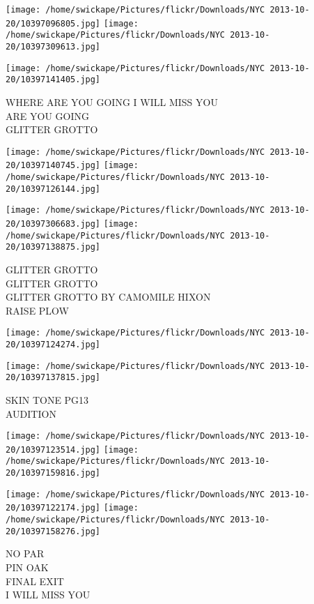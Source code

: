 \documentclass[10pt,letterpaper]{article}
\begin{document}
\texttt{[image: /home/swickape/Pictures/flickr/Downloads/NYC 2013-10-20/10397096805.jpg]}
\texttt{[image: /home/swickape/Pictures/flickr/Downloads/NYC 2013-10-20/10397309613.jpg]}

\vspace{0.25in}
\texttt{[image: /home/swickape/Pictures/flickr/Downloads/NYC 2013-10-20/10397141405.jpg]}

WHERE ARE YOU GOING I WILL MISS YOU\\
ARE YOU GOING\\
GLITTER GROTTO
\pagebreak

\texttt{[image: /home/swickape/Pictures/flickr/Downloads/NYC 2013-10-20/10397140745.jpg]}
\texttt{[image: /home/swickape/Pictures/flickr/Downloads/NYC 2013-10-20/10397126144.jpg]}

\texttt{[image: /home/swickape/Pictures/flickr/Downloads/NYC 2013-10-20/10397306683.jpg]}
\texttt{[image: /home/swickape/Pictures/flickr/Downloads/NYC 2013-10-20/10397138875.jpg]}

GLITTER GROTTO\\
GLITTER GROTTO\\
GLITTER GROTTO BY CAMOMILE HIXON\\
RAISE PLOW
\pagebreak

\texttt{[image: /home/swickape/Pictures/flickr/Downloads/NYC 2013-10-20/10397124274.jpg]}

\vspace{0.25in}
\texttt{[image: /home/swickape/Pictures/flickr/Downloads/NYC 2013-10-20/10397137815.jpg]}

SKIN TONE PG13\\
AUDITION
\pagebreak

\texttt{[image: /home/swickape/Pictures/flickr/Downloads/NYC 2013-10-20/10397123514.jpg]}
\texttt{[image: /home/swickape/Pictures/flickr/Downloads/NYC 2013-10-20/10397159816.jpg]}

\texttt{[image: /home/swickape/Pictures/flickr/Downloads/NYC 2013-10-20/10397122174.jpg]}
\texttt{[image: /home/swickape/Pictures/flickr/Downloads/NYC 2013-10-20/10397158276.jpg]}

NO PAR\\
PIN OAK\\
FINAL EXIT\\
I WILL MISS YOU
\pagebreak
\end{document}
